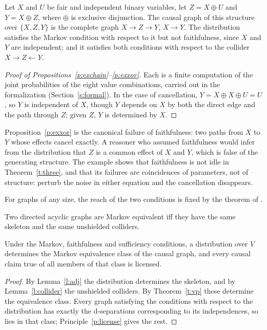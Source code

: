 \documentclass{situationist-preprint}
\begin{document}
\begin{proposition}[Cancellation]\label{p:exxor}
Let $X$ and $U$ be fair and independent binary variables, let $Z = X \oplus U$ and $Y = X \oplus Z$, where $\oplus$ is exclusive disjunction. The causal graph of this structure over $\{X, Z, Y\}$ is the complete graph $X \to Z \to Y$, $X \to Y$. The distribution satisfies the Markov condition with respect to it but not faithfulness, since $X$ and $Y$ are independent; and it satisfies both conditions with respect to the collider $X \to Z \leftarrow Y$.
\end{proposition}

\begin{proof}[Proof of Propositions~\ref{p:exchain}--\ref{p:exxor}]
Each is a finite computation of the joint probabilities of the eight value combinations, carried out in the formalization (Section~\ref{s:formal}). In the case of cancellation, $Y = X \oplus X \oplus U = U$, so $Y$ is independent of $X$, though $Y$ depends on $X$ by both the direct edge and the path through $Z$; given $Z$, $Y$ is determined by $X$.
\end{proof}

Proposition~\ref{p:exxor} is the canonical failure of faithfulness: two paths from $X$ to $Y$ whose effects cancel exactly. A reasoner who assumed faithfulness would infer from the distribution that $Z$ is a common effect of $X$ and $Y$, which is false of the generating structure. The example shows that faithfulness is not idle in Theorem~\ref{t:three}, and that its failures are coincidences of parameters, not of structure: perturb the noise in either equation and the cancellation disappears.

For graphs of any size, the reach of the two conditions is fixed by the theorem of \citet{Verma1990}.

\begin{theorem}\label{t:vp}
Two directed acyclic graphs are Markov equivalent iff they have the same skeleton and the same unshielded colliders.
\end{theorem}

\begin{corollary}[Licensing]\label{c:license}
Under the Markov, faithfulness and sufficiency conditions, a distribution over $V$ determines the Markov equivalence class of the causal graph, and every causal claim true of all members of that class is licensed.
\end{corollary}

\begin{proof}
By Lemma~\ref{l:adj} the distribution determines the skeleton, and by Lemma~\ref{l:collider} the unshielded colliders. By Theorem~\ref{t:vp} these determine the equivalence class. Every graph satisfying the conditions with respect to the distribution has exactly the d-separations corresponding to its independences, so lies in that class; Principle~\ref{p:license} gives the rest.
\end{proof}
\end{document}
